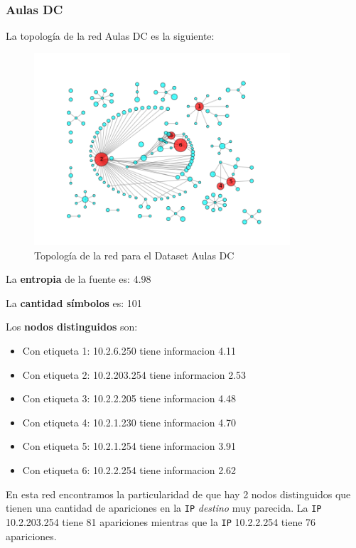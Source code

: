 \subsubsection{Aulas DC}

La topología de la red Aulas DC es la siguiente:

\begin{figure}[H]
    \centering
    \includegraphics[width=0.85\textwidth]{imagenes/aulasDC.png}
    \caption{Topología de la red para el Dataset Aulas DC}
\end{figure}

La \textbf{entropia} de la fuente es: 4.98

La \textbf{cantidad símbolos} es: 101

Los \textbf{nodos distinguidos} son:

\begin{itemize}
    \item Con etiqueta 1: 10.2.6.250 tiene informacion 4.11
    \item Con etiqueta 2: 10.2.203.254 tiene informacion 2.53
    \item Con etiqueta 3: 10.2.2.205 tiene informacion 4.48
    \item Con etiqueta 4: 10.2.1.230 tiene informacion 4.70
    \item Con etiqueta 5: 10.2.1.254 tiene informacion 3.91
    \item Con etiqueta 6: 10.2.2.254 tiene informacion 2.62
\end{itemize}

En esta red encontramos la particularidad de que hay 2 nodos distinguidos que tienen
una cantidad de apariciones en la \texttt{IP} \textit{destino} muy parecida.
La \texttt{IP} 10.2.203.254 tiene 81 apariciones mientras que la \texttt{IP} 10.2.2.254 tiene 76 apariciones.


